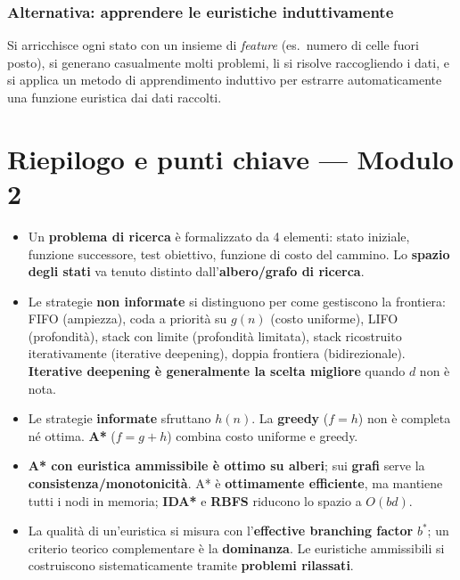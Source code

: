 \documentclass[11pt,a4paper]{report}
\begin{document}
\subsubsection*{Alternativa: apprendere le euristiche induttivamente}

Si arricchisce ogni stato con un insieme di \emph{feature} (es.\ numero di celle fuori posto), si generano casualmente molti problemi, li si risolve raccogliendo i dati, e si applica un metodo di apprendimento induttivo per estrarre automaticamente una funzione euristica dai dati raccolti.

\section*{Riepilogo e punti chiave --- Modulo 2}

\begin{itemize}
  \item Un \textbf{problema di ricerca} è formalizzato da 4 elementi: stato iniziale, funzione successore, test obiettivo, funzione di costo del cammino. Lo \textbf{spazio degli stati} va tenuto distinto dall'\textbf{albero/grafo di ricerca}.
  \item Le strategie \textbf{non informate} si distinguono per come gestiscono la frontiera: FIFO (ampiezza), coda a priorità su $g(n)$ (costo uniforme), LIFO (profondità), stack con limite (profondità limitata), stack ricostruito iterativamente (iterative deepening), doppia frontiera (bidirezionale). \textbf{Iterative deepening è generalmente la scelta migliore} quando $d$ non è nota.
  \item Le strategie \textbf{informate} sfruttano $h(n)$. La \textbf{greedy} ($f=h$) non è completa né ottima. \textbf{A*} ($f=g+h$) combina costo uniforme e greedy.
  \item \textbf{A* con euristica ammissibile è ottimo su alberi}; sui \textbf{grafi} serve la \textbf{consistenza/monotonicità}. A* è \textbf{ottimamente efficiente}, ma mantiene tutti i nodi in memoria; \textbf{IDA*} e \textbf{RBFS} riducono lo spazio a $O(bd)$.
  \item La qualità di un'euristica si misura con l'\textbf{effective branching factor} $b^*$; un criterio teorico complementare è la \textbf{dominanza}. Le euristiche ammissibili si costruiscono sistematicamente tramite \textbf{problemi rilassati}.
\end{itemize}

\end{document}

